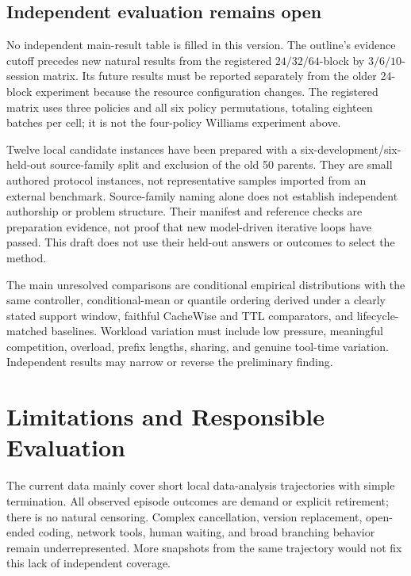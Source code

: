 \documentclass[sigconf, screen, review]{acmart}
\begin{document}
\subsection{Independent evaluation remains
open}\label{independent-evaluation-remains-open}

No independent main-result table is filled in this version. The
outline's evidence cutoff precedes new natural results from the
registered \(24/32/64\)-block by \(3/6/10\)-session matrix. Its future
results must be reported separately from the older 24-block experiment
because the resource configuration changes. The registered matrix uses
three policies and all six policy permutations, totaling eighteen
batches per cell; it is not the four-policy Williams experiment above.

Twelve local candidate instances have been prepared with a
six-development/six-held-out source-family split and exclusion of the
old 50 parents. They are small authored protocol instances, not
representative samples imported from an external benchmark.
Source-family naming alone does not establish independent authorship or
problem structure. Their manifest and reference checks are preparation
evidence, not proof that new model-driven iterative loops have passed.
This draft does not use their held-out answers or outcomes to select the
method.

The main unresolved comparisons are conditional empirical distributions
with the same controller, conditional-mean or quantile ordering derived
under a clearly stated support window, faithful CacheWise and TTL
comparators, and lifecycle-matched baselines. Workload variation must
include low pressure, meaningful competition, overload, prefix lengths,
sharing, and genuine tool-time variation. Independent results may narrow
or reverse the preliminary finding.

\section{Limitations and Responsible
Evaluation}\label{limitations-and-responsible-evaluation}

The current data mainly cover short local data-analysis trajectories
with simple termination. All observed episode outcomes are demand or
explicit retirement; there is no natural censoring. Complex
cancellation, version replacement, open-ended coding, network tools,
human waiting, and broad branching behavior remain underrepresented.
More snapshots from the same trajectory would not fix this lack of
independent coverage.
\end{document}
